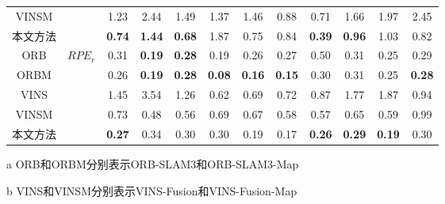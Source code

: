 \begin{table}
\begin{threeparttable}
\begin{tabular}{c|c|cccccccccc}
VINSM &                       & 1.23          & 2.44          & 1.49          & 1.37          & 1.46          & 0.88          & 0.71          & 1.66          & 1.97          & 2.45          \\
本文方法    &                       & \cellcolor[HTML]{FA7F6F}\textbf{0.74} & \cellcolor[HTML]{FA7F6F}\textbf{1.44} & \cellcolor[HTML]{FA7F6F}\textbf{0.68} & 1.87          & 0.75          & 0.84          & \cellcolor[HTML]{FA7F6F}\textbf{0.39} & \cellcolor[HTML]{FA7F6F}\textbf{0.96} & 1.03          & 0.82          \\ \midrule
ORB   & \multirow{5}{*}{$RPE_r$\textdownarrow{}} & 0.31          & \cellcolor[HTML]{FA7F6F}\textbf{0.19} & \cellcolor[HTML]{FA7F6F}\textbf{0.28} & 0.19          & 0.26          & 0.27          & 0.50          & 0.31          & 0.25          & 0.29          \\
ORBM  &                       & 0.26          & \cellcolor[HTML]{FA7F6F}\textbf{0.19} & \cellcolor[HTML]{FA7F6F}\textbf{0.28} & \cellcolor[HTML]{FA7F6F}\textbf{0.08} & \cellcolor[HTML]{FA7F6F}\textbf{0.16} & \cellcolor[HTML]{FA7F6F}\textbf{0.15} & 0.30          & 0.31          & 0.25          & \cellcolor[HTML]{FA7F6F}\textbf{0.28} \\
VINS  &                       & 1.45          & 3.54          & 1.26          & 0.62          & 0.69          & 0.72          & 0.87          & 1.77          & 1.87          & 0.94          \\
VINSM &                       & 0.73          & 0.48          & 0.56          & 0.69          & 0.67          & 0.58          & 0.57          & 0.65          & 0.59          & 0.99          \\
本文方法    &                       & \cellcolor[HTML]{FA7F6F}\textbf{0.27} & 0.34          & 0.30          & 0.30          & 0.19          & 0.17          & \cellcolor[HTML]{FA7F6F}\textbf{0.26} & \cellcolor[HTML]{FA7F6F}\textbf{0.29} & \cellcolor[HTML]{FA7F6F}\textbf{0.19} & 0.30          \\ \bottomrule
\end{tabular}
\label{tab:loc_kitti}
\begin{tablenotes}
  \item [a] ORB和ORBM分别表示ORB-SLAM3和ORB-SLAM3-Map
  \item [b] VINS和VINSM分别表示VINS-Fusion和VINS-Fusion-Map
\end{tablenotes}
\end{threeparttable}
\end{table}

